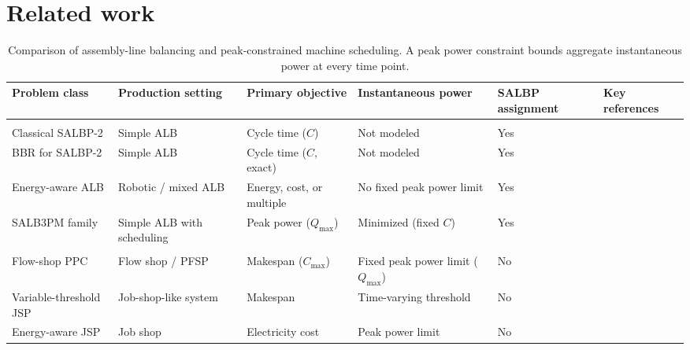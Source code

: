 \documentclass[]{interact}
\theoremstyle{plain}
\theoremstyle{definition}
\theoremstyle{remark}
\begin{document}
\section{Related work}
\label{sec:related-work}

\begin{table}[t!]
\centering
\caption{Comparison of assembly-line balancing and peak-constrained machine scheduling. A peak power constraint bounds aggregate instantaneous power at every time point.}
\label{tab:related-work}
\footnotesize
\renewcommand{\arraystretch}{1.25}
\setlength{\tabcolsep}{4pt}
\begin{tabularx}{\textwidth}{@{}
>{\raggedright\arraybackslash\hsize=1.00\hsize}X
>{\raggedright\arraybackslash\hsize=0.95\hsize}X
>{\centering\arraybackslash\hsize=0.85\hsize}X
>{\centering\arraybackslash\hsize=1.00\hsize}X
>{\centering\arraybackslash\hsize=0.80\hsize}X
>{\raggedright\arraybackslash\hsize=1.40\hsize}X
@{}}
\toprule
Problem class & Production setting & Primary objective & Instantaneous power & SALBP assignment & Key references \\
\midrule
\multicolumn{6}{@{}l}{\textit{Assembly-line balancing literature}} \\
\addlinespace[2pt]
Classical SALBP-2
& Simple ALB & Cycle time ($C$) & Not modeled & Yes
& \citep{Scholl2006,Li2021Enhanced} \\
BBR for SALBP-2
& Simple ALB & Cycle time ($C$, exact) & Not modeled & Yes
& \citep{Alvarez2024BBR} \\
Energy-aware ALB
& Robotic / mixed ALB & Energy, cost, or multiple & No fixed peak power limit & Yes
& \citep{Zhang2018Modelling,Zhang2020A} \\
SALB3PM family
& Simple ALB with scheduling & Peak power ($Q_{\max}$) & Minimized (fixed $C$) & Yes
& \citep{Gianessi2019Simple,Lamy2020IFAC,Py2024POS,Zheng2024Optimizing,VanKieu2025Compact} \\
\addlinespace[4pt]
\multicolumn{6}{@{}l}{\textit{Peak-constrained machine scheduling literature}} \\
\addlinespace[2pt]
Flow-shop PPC
& Flow shop / PFSP & Makespan ($C_{\max}$) & Fixed peak power limit ($Q_{\max}$) & No
& \citep{Fang2013Flow,Wang2019Decoding,Lv2024Considering} \\
Variable-threshold JSP
& Job-shop-like system & Makespan & Time-varying threshold & No
& \citep{Kemmoe2017Jobshop} \\
Energy-aware JSP
& Job shop & Electricity cost & Peak power limit & No
& \citep{Masmoudi2019Jobshop} \\

\end{tabularx}
\end{table}
\end{document}
